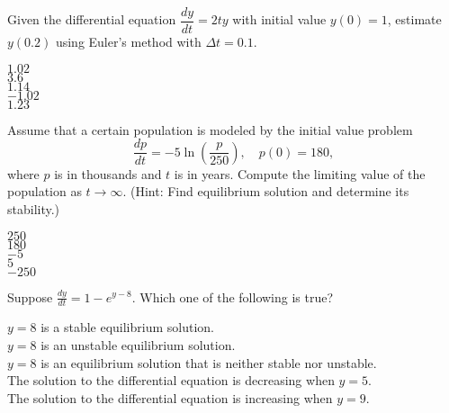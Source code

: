 \documentclass[12pt]{amsart}
\def\ds{\displaystyle}
\begin{document}
\begin{exam}
\begin{problem}
Given the differential equation $\ds \dfrac{dy}{dt} = 2ty$ with initial value
$y(0)=1$, estimate $y(0.2)$ using Euler's method with $\Delta t=0.1$.
\begin{answers}{3}
$1.02$ \\
$3.6$\\
$1.14$ \\
$-1.02$ \\
$1.23$ \\
\end{answers}

\end{problem}






\begin{problem}
Assume that a certain population is modeled by the initial value problem
$$\frac{dp}{dt}=-5\ln (\frac{p}{250}),\quad p(0)=180,$$
where $p$ is in thousands and $t$ is in years.
Compute the limiting value of the population as $t\to\infty$.
(Hint: Find equilibrium solution and determine its stability.)
%
\begin{answers}{1}
$250$ \\
$180$\\
$-5$ \\
$5$ \\
$-250$ \\
\end{answers}

\end{problem}









\begin{problem}
Suppose $\frac{dy}{dt}=1-e^{y-8}$.  Which one of
the following is true?
%
%
\begin{answers}{1}
$y=8$ is a stable equilibrium solution. \\
$y=8$ is an unstable equilibrium solution. \\
$y=8$ is an equilibrium solution that is neither stable nor
unstable. \\
The solution to the differential equation is decreasing when
$y=5$. \\
The solution to the differential equation is increasing when
$y=9$. \\
\end{answers}
\end{problem}











\end{exam}
\end{document}
